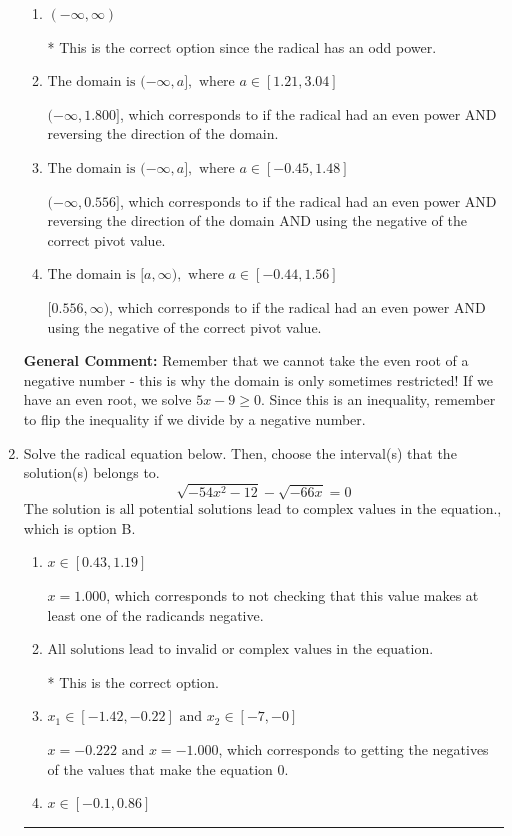 \documentclass{extbook}[14pt]
\newcommand{\litem}[1]{\item #1

\rule{\textwidth}{0.4pt}}
\begin{document}
\begin{enumerate}
{\begin{enumerate}[label=\Alph*.]
$[1.800, \infty)$, which corresponds to if the radical had an even power.
\item \( (-\infty, \infty) \)

* This is the correct option since the radical has an odd power.
\item \( \text{The domain is } (-\infty, a], \text{   where } a \in [1.21, 3.04] \)

$(-\infty, 1.800]$, which corresponds to if the radical had an even power AND reversing the direction of the domain.
\item \( \text{The domain is } (-\infty, a], \text{   where } a \in [-0.45, 1.48] \)

$(-\infty, 0.556]$, which corresponds to if the radical had an even power AND reversing the direction of the domain AND using the negative of the correct pivot value.
\item \( \text{The domain is } [a, \infty), \text{   where } a \in [-0.44, 1.56] \)

$[0.556, \infty)$, which corresponds to if the radical had an even power AND using the negative of the correct pivot value.
\end{enumerate}

\textbf{General Comment:} Remember that we cannot take the even root of a negative number - this is why the domain is only sometimes restricted! If we have an even root, we solve $5 x - 9 \geq 0$. Since this is an inequality, remember to flip the inequality if we divide by a negative number.
}
\litem{
Solve the radical equation below. Then, choose the interval(s) that the solution(s) belongs to.
\[ \sqrt{-54 x^2 - 12} - \sqrt{-66 x} = 0 \]The solution is \( \text{all potential solutions lead to complex values in the equation.} \), which is option B.\begin{enumerate}[label=\Alph*.]
\item \( x \in [0.43,1.19] \)

$x = 1.000$, which corresponds to not checking that this value makes at least one of the radicands negative.
\item \( \text{All solutions lead to invalid or complex values in the equation.} \)

* This is the correct option.
\item \( x_1 \in [-1.42, -0.22] \text{ and } x_2 \in [-7,-0] \)

$x = -0.222 \text{ and } x = -1.000$, which corresponds to getting the negatives of the values that make the equation 0.
\item \( x \in [-0.1,0.86] \)


\end{enumerate}}
\end{enumerate}
\end{document}
